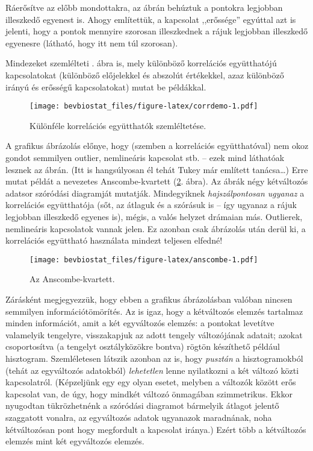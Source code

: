 \documentclass[]{book}
\begin{document}
Ráerősítve az előbb mondottakra, az ábrán behúztuk a pontokra legjobban
illeszkedő egyenest is. Ahogy említettük, a kapcsolat ,,erőssége''
egyúttal azt is jelenti, hogy a pontok mennyire szorosan illeszkednek a
rájuk legjobban illeszkedő egyenesre (látható, hogy itt nem túl
szorosan).

Mindezeket szemlélteti . ábra is, mely különböző
korrelációs együtthatójú kapcsolatokat (különböző előjelekkel és
abszolút értékekkel, azaz különböző irányú és erősségű kapcsolatokat)
mutat be példákkal.

\begin{figure}
\centering
\texttt{[image: bevbiostat\_files/figure-latex/corrdemo-1.pdf]}
\caption{\label{fig:corrdemo}Különféle korrelációs együtthatók
szemléltetése.}
\end{figure}

A grafikus ábrázolás előnye, hogy (szemben a korrelációs együtthatóval)
nem okoz gondot semmilyen outlier, nemlineáris kapcsolat stb. -- ezek
mind láthatóak lesznek az ábrán. (Itt is hangsúlyosan él tehát Tukey már
említett tanácsa\dots{}) Erre mutat példát a nevezetes Anscombe-kvartett
(\ref{fig:anscombe}. ábra). Az ábrák négy kétváltozós adatsor szóródási
diagramját mutatják. Mindegyiknek \emph{hajszálpontosan ugyanaz} a
korrelációs együtthatója (sőt, az átlaguk és a szórásuk is -- így
ugyanaz a rájuk legjobban illeszkedő egyenes is), mégis, a valós helyzet
drámaian más. Outlierek, nemlineáris kapcsolatok vannak jelen. Ez
azonban csak ábrázolás után derül ki, a korrelációs együttható
használata mindezt teljesen elfedné!

\begin{figure}
\centering
\texttt{[image: bevbiostat\_files/figure-latex/anscombe-1.pdf]}
\caption{\label{fig:anscombe}Az Anscombe-kvartett.}
\end{figure}

Zárásként megjegyezzük, hogy ebben a grafikus ábrázolásban valóban
nincsen semmilyen információtömörítés. Az is igaz, hogy a kétváltozós
elemzés tartalmaz minden információt, amit a két egyváltozós elemzés: a
pontokat levetítve valamelyik tengelyre, visszakapjuk az adott tengely
változójának adatait; azokat csoportosítva (a tengelyt osztályközökre
bontva) rögtön készíthető például hisztogram. Szemléletesen látszik
azonban az is, hogy \emph{pusztán} a hisztogramokból (tehát az
egyváltozós adatokból) \emph{lehetetlen} lenne nyilatkozni a két változó
közti kapcsolatról. (Képzeljünk egy egy olyan esetet, melyben a változók
között erős kapcsolat van, de úgy, hogy mindkét változó önmagában
szimmetrikus. Ekkor nyugodtan tükrözhetnénk a szóródási diagramot
bármelyik átlagot jelentő szaggatott vonalra, az egyváltozós adatok
ugyanazok maradnának, noha kétváltozósan pont hogy megfordult a
kapcsolat iránya.) Ezért több a kétváltozós elemzés mint két egyváltozós
elemzés.
\end{document}
